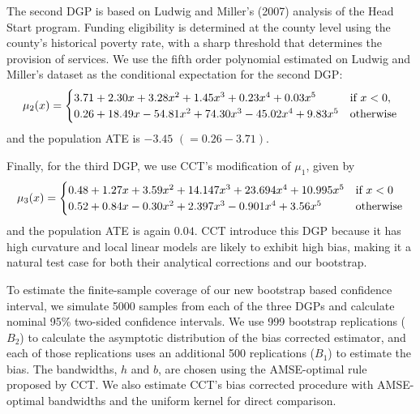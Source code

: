 \documentclass[12pt,fleqn]{article}
\begin{document}
\nocite{ludwig2007}%
The second DGP is based on Ludwig and Miller's (2007) analysis of the Head Start
program. Funding eligibility is determined at the county level using the
county's historical poverty rate, with a sharp threshold that determines the
provision of services. We use the fifth order polynomial estimated on Ludwig and
Miller's dataset as the conditional expectation for the second DGP:
\begin{equation*}
  \mu_{2}(x) =
  \begin{cases}
    3.71 + 2.30x + 3.28x^2 + 1.45x^3 + 0.23x^4 + 0.03x^5
    & \text{if}\ x < 0, \\
    0.26 + 18.49x - 54.81x^2 + 74.30x^3 - 45.02x^4 + 9.83x^5
    & \text{otherwise}
  \end{cases}
\end{equation*}
and the population ATE is $-3.45$ $(= 0.26 - 3.71)$.

Finally, for the third DGP, we use CCT's modification of $\mu_1$, given by
\begin{equation*}
  \mu_{3}(x) =
  \begin{cases}
    0.48 + 1.27x + 3.59 x^{2} + 14.147 x^3 + 23.694 x^4 + 10.995 x^5
    & \text{if}\ x < 0 \\
    0.52 + 0.84x - 0.30 x^{2} + 2.397 x^3 - 0.901 x^4 + 3.56 x^5
    & \text{otherwise}
\end{cases}
\end{equation*}
and the population ATE is again $0.04$. CCT introduce this DGP because it has
high curvature and local linear models are likely to exhibit high bias, making
it a natural test case for both their analytical corrections and our bootstrap.

To estimate the finite-sample coverage of our new bootstrap based confidence interval, we
simulate 5000 samples from each of the three DGPs and calculate nominal 95\%
two-sided confidence intervals. We use 999 bootstrap replications ($B_2$) to
calculate the asymptotic distribution of the bias corrected estimator, and each
of those replications uses an additional 500 replications ($B_1$) to estimate
the bias. The bandwidths, $h$ and $b$,
are chosen using the AMSE-optimal rule proposed by CCT. We also estimate CCT's bias corrected procedure with AMSE-optimal bandwidths and
the uniform kernel for direct comparison.
\end{document}
